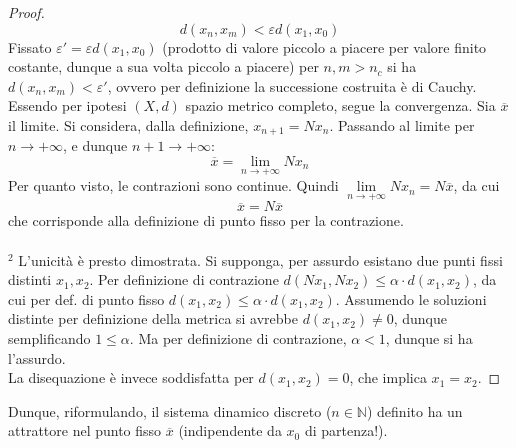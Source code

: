 \documentclass[10pt]{article}
\theoremstyle{plain}
\begin{document}
\begin{proof}
\[d(x_n, x_m) < \varepsilon d(x_1, x_0)\]
Fissato $\varepsilon' = \varepsilon d(x_1, x_0)$ (prodotto di valore piccolo a piacere per valore finito costante, dunque a sua volta piccolo a piacere) per $n, m > n_c$ si ha $d(x_n, x_m) < \varepsilon'$, ovvero per definizione la successione costruita è di Cauchy.
\\Essendo per ipotesi $(X,d)$ spazio metrico completo, segue la convergenza. Sia $\overline{x}$ il limite. Si considera, dalla definizione, $x_{n+1} = N x_n$. Passando al limite per $n \rightarrow +\infty$, e dunque $n+1 \rightarrow +\infty$: 
\[\overline{x} = \lim\limits_{n \rightarrow +\infty} N x_n\]
Per quanto visto, le contrazioni sono continue. Quindi $\displaystyle \lim\limits_{n \rightarrow +\infty} N x_n = N \overline{x}$, da cui
\[\overline{x} = N \overline{x}\]
che corrisponde alla definizione di punto fisso per la contrazione.
\\~\\$^2$ L'unicità è presto dimostrata. Si supponga, per assurdo esistano due punti fissi distinti $x_1, x_2$. Per definizione di contrazione $d(N x_1, N x_2) \leq \alpha \cdot d(x_1, x_2)$, da cui per def. di punto fisso $d(x_1, x_2) \leq \alpha \cdot d(x_1, x_2)$. Assumendo le soluzioni distinte per definizione della metrica si avrebbe $d(x_1, x_2) \neq 0$, dunque semplificando $1 \leq \alpha$. Ma per definizione di contrazione, $\alpha < 1$, dunque si ha l'assurdo.
\\La disequazione è invece soddisfatta per $d(x_1, x_2) = 0$, che implica $x_1 = x_2$.
\end{proof}
Dunque, riformulando, il sistema dinamico discreto ($n \in \mathbb{N}$) definito ha un attrattore nel punto fisso $\overline{x}$ (indipendente da $x_0$ di partenza!).
\end{document}
